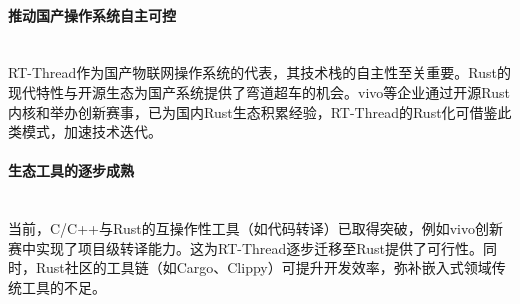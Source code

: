 \paragraph{推动国产操作系统自主可控}\ \\
 \indent RT-Thread作为国产物联网操作系统的代表，其技术栈的自主性至关重要。Rust的现代特性与开源生态为国产系统提供了弯道超车的机会。vivo等企业通过开源Rust内核和举办创新赛事，已为国内Rust生态积累经验，RT-Thread的Rust化可借鉴此类模式，加速技术迭代。\cite{4}
\paragraph{生态工具的逐步成熟}\ \\
 \indent 当前，C/C++与Rust的互操作性工具（如代码转译）已取得突破，例如vivo创新赛中实现了项目级转译能力。这为RT-Thread逐步迁移至Rust提供了可行性。同时，Rust社区的工具链（如Cargo、Clippy）可提升开发效率，弥补嵌入式领域传统工具的不足。\cite{4}
